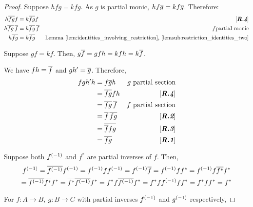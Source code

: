     \begin{proof}
      \bproofenum
        \item Suppose $h f g = k f g$. As $g$ is partial monic, $h f \overline{g} = k f \overline{g}$. 
          Therefore:
          \begin{align*}
            h \overline{f g} f &= k \overline{f g} f &[\emph{\bfseries R.4}]\\
            h \overline{f g}\,\overline{f} &= k \overline{f g}\, \overline{f} & f\text{partial monic}\\
            h \overline{fg}&= k \overline{fg} & \text{Lemma \ref{lem:identities_involving_restriction}, 
              \ref{lemsub:restriction_identities_two}}
          \end{align*}
        \item Suppose $g f = k f$. Then, $g\overline{f} = g f h = k f h = k \overline{f}$.
        \item We have $f h = \overline{f}$ and $g h' = \overline{g}$. Therefore,
          \begin{align*}
            f g h' h &= f \overline{g} h & g \text{ partial section}\\
            &= \overline{f g} f h & [\emph{\bfseries R.4}]\\
            &= \overline{f g}\, \overline{f} & f \text{ partial section}\\
            &= \overline{f}\, \overline{f g} & [\emph{\bfseries R.2}]\\
            &= \overline{\overline{f}f g} & [\emph{\bfseries R.3}]\\
            &= \overline{f g} & [\emph{\bfseries R.1}]
          \end{align*}
        \item Suppose both ${f}^{(-1)}$ and $f^*$ are partial inverses of $f$. Then,
          \begin{multline*}
            \inv{f}
            = \restr{\inv{f}}\inv{f} %
            =\inv{f}f\inv{f}  %
            = \inv{f} \restr{f}   %
            = \inv{f} f f^*   %
            = \inv{f} f \restr{f^*} f^*  \\ %
            = \restr{\inv{f}}\restr{f^*} f^*   %
            = \restr{f^*}\restr{\inv{f}} f^* %
            = f^* f \restr{\inv{f}}  f^* %
            = f^* f \inv{f} f f^* %
            = f^* f f^* %
            = f^* %
          \end{multline*}
        \item For $f:A\to B,\ g:B\to C$ with partial inverses ${f}^{(-1)}$ and ${g}^{(-1)}$ respectively, 

\end{proof}
